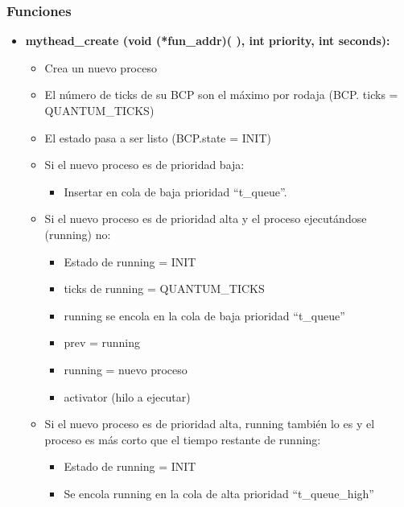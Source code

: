 \documentclass[10pt, spanish, pdftex]{template/UC3M_document}
\begin{document}
\subsubsection{Funciones}
\begin{itemize}
    \item \textbf{mythead\_create (void (*fun\_addr)( ), int priority, int seconds):}
    \vspace{-2mm}
    \begin{itemize}
     \setlength{\itemsep}{-1.5mm}
        \item Crea un nuevo proceso
        \item El número de ticks de su BCP son el máximo por rodaja (BCP. ticks = QUANTUM\_TICKS)
        \item El estado pasa a ser listo (BCP.state = INIT)
        \item Si el nuevo proceso es de prioridad baja:
        \vspace{-2mm}
    \begin{itemize}
     \setlength{\itemsep}{-1.5mm}
            \item Insertar en cola de baja prioridad “t\_queue”.
        \end{itemize}
        \item Si el nuevo proceso es de prioridad alta y el proceso ejecutándose (running) no:
        \vspace{-2mm}
    \begin{itemize}
     \setlength{\itemsep}{-1.5mm}
            \item Estado de running = INIT
            \item ticks de running = QUANTUM\_TICKS
            \item running se encola en la cola de baja prioridad “t\_queue”
            \item prev = running
            \item running = nuevo proceso
            \item activator (hilo a ejecutar)
        \end{itemize}
        \item Si el nuevo proceso es de prioridad alta, running también lo es y el proceso es más corto que el tiempo restante de running:
        \vspace{-2mm}
    \begin{itemize}
     \setlength{\itemsep}{-1.5mm}
            \item Estado de running = INIT
            \item Se encola running en la cola de alta prioridad “t\_queue\_high”

\end{itemize}
\end{itemize}
\end{itemize}
\end{document}
